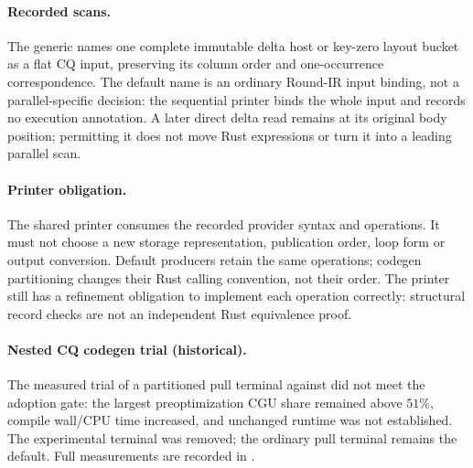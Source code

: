 \paragraph{Recorded scans.} The generic  names one complete
immutable delta host or key-zero layout bucket as a flat CQ input, preserving
its column order and one-occurrence correspondence. The default
 name is an ordinary Round-IR input binding,
not a parallel-specific decision: the sequential printer binds the whole
input and records no execution annotation. A later direct delta read remains
at its original body position; permitting it does not move Rust expressions
or turn it into a leading parallel scan.

\paragraph{Printer obligation.} The shared printer consumes the recorded
provider syntax and operations. It must not choose a new storage representation,
publication order, loop form or output conversion. Default producers retain
the same operations; codegen partitioning changes their Rust calling convention,
not their order. The printer
still has a refinement obligation to implement each operation correctly:
structural record checks are not an independent Rust equivalence proof.
\paragraph{Nested CQ codegen trial (historical).} The measured trial of a
partitioned pull terminal against  did not meet the adoption gate:
the largest preoptimization CGU share remained above $51\%$, compile wall/CPU
time increased, and unchanged runtime was not established. The experimental
terminal was removed; the ordinary pull terminal remains the default.
Full measurements are recorded in
.
